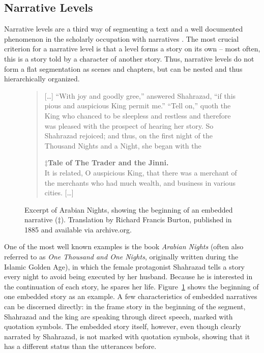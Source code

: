 \documentclass[10pt, a4paper]{article}
\begin{document}
\subsection{Narrative Levels}
Narrative levels are a third way of segmenting a text and a well documented phenomenon in the scholarly occupation with narratives \cite[43\,ff.]{Bal:1997aa}. The most crucial criterion for a narrative level is that a level forms a story on its own -- most often, this is a story told by a character of another story. Thus, narrative levels do not form a flat segmentation as scenes and chapters, but can be nested and thus hierarchically organized. 

\begin{figure}
\begin{quote}
[\dots] \enquote{With joy and goodly gree,} answered Shahrazad, \enquote{if this pious and auspicious King permit me.} \enquote{Tell on,} quoth the King who chanced to be sleepless and restless and therefore was pleased with the prospect of hearing her story. So Shahrazad rejoiced; and thus, on the first night of the Thousand Nights and a Night, she began with the

\noindent$\ddagger$\textbf{Tale of The Trader and the Jinni.}\\
\noindent It is related, O auspicious King, that there was a merchant of the merchants who had much wealth, and business in various cities. [\dots]
\end{quote}
\caption{Excerpt of Arabian Nights, showing the beginning of an embedded narrative ($\ddagger$). Translation by Richard Francis Burton, published in 1885 and available via archive.org.}
\label{fig:arabian-nights}
\end{figure}

One of the most well known examples is the book \textit{Arabian Nights} (often also referred to as \textit{One Thousand and One Nights}, originally written during the Islamic Golden Age), in which the female protagonist Shahrazad tells a story every night to avoid being executed by her husband. Because he is interested in the continuation of each story, he spares her life. Figure~\ref{fig:arabian-nights} shows the beginning of one embedded story as an example. A few characteristics of embedded narratives can be discerned directly: in the frame story in the beginning of the segment, Shahrazad and the king are speaking through direct speech, marked with quotation symbols. The embedded story itself, however, even though clearly narrated by Shahrazad, is not marked with quotation symbols, showing that it has a different status than the utterances before.
\end{document}
